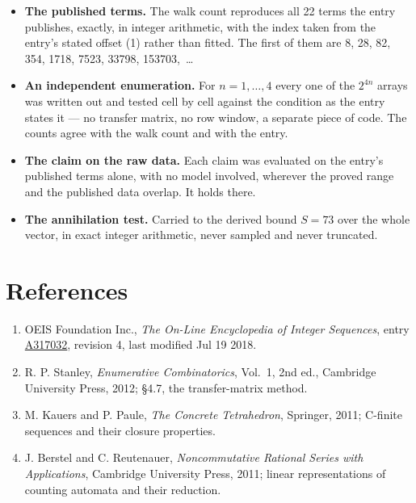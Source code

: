 \documentclass[11pt]{article}
\theoremstyle{definition}
\begin{document}
\begin{itemize}

\item {\bfseries The published terms.} The walk count reproduces all 22 terms the entry publishes, exactly, in integer arithmetic, with the index taken from the entry's stated offset (1) rather than fitted. The first of them are 8, 28, 82, 354, 1718, 7523, 33798, 153703,~\dots

\item {\bfseries An independent enumeration.} For $n = 1,\dots,4$ every one of the $2^{4n}$ arrays was written out and tested cell by cell against the condition as the entry states it --- no transfer matrix, no row window, a separate piece of code. The counts agree with the walk count and with the entry.

\item {\bfseries The claim on the raw data.} Each claim was evaluated on the entry's published terms alone, with no model involved, wherever the proved range and the published data overlap. It holds there.

\item {\bfseries The annihilation test.} Carried to the derived bound $S = 73$ over the whole vector, in exact integer arithmetic, never sampled and never truncated.

\end{itemize}

\section{References}

\begin{enumerate}

\item OEIS Foundation Inc., \emph{The On-Line Encyclopedia of Integer Sequences}, entry \href{https://oeis.org/A317032}{A317032}, revision 4, last modified Jul 19 2018.

\item R. P. Stanley, \emph{Enumerative Combinatorics}, Vol.~1, 2nd ed., Cambridge University Press, 2012; \S4.7, the transfer-matrix method.

\item M. Kauers and P. Paule, \emph{The Concrete Tetrahedron}, Springer, 2011; C-finite sequences and their closure properties.

\item J. Berstel and C. Reutenauer, \emph{Noncommutative Rational Series with Applications}, Cambridge University Press, 2011; linear representations of counting automata and their reduction.

\end{enumerate}
\end{document}
